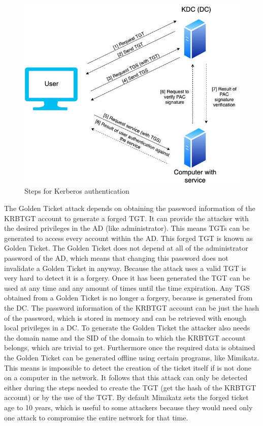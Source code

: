 \begin{figure}[H]
	\label{kerberos_exchange}
	\centering
	\includegraphics[width=.8\textwidth]{figuras/TGT_TGS_PAC.jpg}
	\caption{Steps for Kerberos authentication}
\end{figure}
\linej
The Golden Ticket attack depends on obtaining the password information of the KRBTGT account to generate a forged TGT. It can provide the attacker with the desired privileges in the AD (like administrator).
\linej
This means TGTs can be generated to access every account within the AD. This forged TGT is known as Golden Ticket.
The Golden Ticket does not depend at all of the administrator password of the AD, which means that changing this password does not invalidate a Golden Ticket in anyway.
\linej
\linej
Because the attack uses a valid TGT is very hard to detect it is a forgery. Once it has been generated the TGT can be used at any time and any amount of times until the time expiration.
Any TGS obtained from a Golden Ticket is no longer a forgery, because is generated from the DC.
\linej
\linej
The password information of the KRBTGT account can be just the hash of the password, which is stored in memory and can be retrieved with enough local privileges in a DC. To generate the Golden Ticket the attacker also needs the domain name and the SID of the domain to which the KRBTGT account belongs, which are trivial to get\cite{stealthbits}.
\linej
Furthermore once the required data is obtained the Golden Ticket can be generated offline using certain programs, like Mimikatz. This means is impossible to detect the creation of the ticket itself if is not done on a computer in the network.
\linej
It follows that this attack can only be detected either during the steps needed to create the TGT (get the hash of the KRBTGT account) or by the use of the TGT.
\linej
\linej
By default Mimikatz sets the forged ticket age to 10 years, which is useful to some attackers because they would need only one attack to compromise the entire network for that time.

